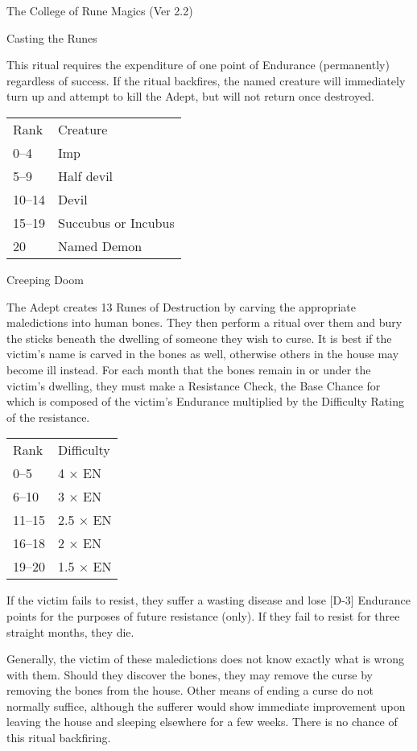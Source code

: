 \begin{Chapter}{The College of Rune Magics (Ver 2.2)}
\begin{ritual}[R-3]{Casting the Runes}
\begin{effects}
This ritual requires the expenditure of one point of Endurance
(permanently) regardless of success.  If the ritual backfires, the
named creature will immediately turn up and attempt to kill the Adept,
but will not return once destroyed.

\begin{tabularx}{\columnwidth}{lX}
Rank	& Creature \\
0--4	& Imp \\
5--9	& Half devil \\
10--14	& Devil \\
15--19	& Succubus or Incubus \\
20	& Named Demon \\
\end{tabularx}
\end{effects}
\end{ritual}

\begin{ritual}[R-4]{Creeping Doom}

\begin{effects}
The Adept creates 13 Runes of Destruction by carving the appropriate
maledictions into human bones.  They then perform a ritual over them
and bury the sticks beneath the dwelling of someone they wish to
curse.  It is best if the victim’s name is carved in the bones as
well, otherwise others in the house may become ill instead. For each
month that the bones remain in or under the victim’s dwelling, they
must make a Resistance Check, the Base Chance for which is composed of
the victim’s Endurance multiplied by the Difficulty Rating of the
resistance.

\begin{tabularx}{\columnwidth}{lX}
Rank	& Difficulty \\
0--5	& 4 × EN \\
6--10	& 3 × EN \\
11--15	& 2.5 × EN \\
16--18	& 2 × EN \\
19--20	& 1.5 × EN \\
\end{tabularx}

If the victim fails to resist, they suffer a wasting disease and lose
[D-3] Endurance points for the purposes of future resistance (only).
If they fail to resist for three straight months, they die.

Generally, the victim of these maledictions does not know exactly what
is wrong with them. Should they discover the bones, they may remove
the curse by removing the bones from the house.  Other means of ending
a curse do not normally suffice, although the sufferer would show
immediate improvement upon leaving the house and sleeping elsewhere
for a few weeks.  There is no chance of this ritual backfiring.
\end{effects}
\end{ritual}


\end{Chapter}
